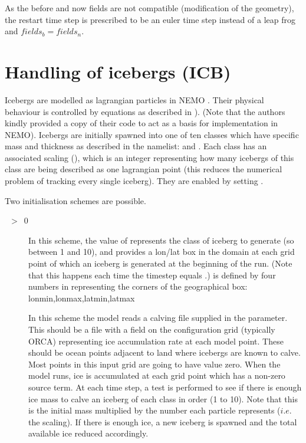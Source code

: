 \documentclass[../tex_main/NEMO_manual]{subfiles}
\begin{document}
As the before and now fields are not compatible (modification of the geometry), the restart time step is prescribed to be an euler time step instead of a leap frog and $fields_b = fields_n$.
%
\section{Handling of icebergs (ICB)}
\label{sec:ICB_icebergs}


Icebergs are modelled as lagrangian particles in NEMO \citep{Marsh_GMD2015}.
Their physical behaviour is controlled by equations as described in \citet{Martin_Adcroft_OM10} ).
(Note that the authors kindly provided a copy of their code to act as a basis for implementation in NEMO).
Icebergs are initially spawned into one of ten classes which have specific mass and thickness as described 
in the  namelist: 
 and .
Each class has an associated scaling (), which is an integer representing how many icebergs 
of this class are being described as one lagrangian point (this reduces the numerical problem of tracking every single iceberg).
They are enabled by setting .

Two initialisation schemes are possible.
\begin{description}
\item[~$>$~0]
In this scheme, the value of  represents the class of iceberg to generate 
(so between 1 and 10), and  provides a lon/lat box in the domain at each 
grid point of which an iceberg is generated at the beginning of the run. 
(Note that this happens each time the timestep equals .)
 is defined by four numbers in  representing the corners 
of the geographical box: lonmin,lonmax,latmin,latmax
\item[]
In this scheme the model reads a calving file supplied in the  parameter.
This should be a file with a field on the configuration grid (typically ORCA) representing ice accumulation rate at each model point. 
These should be ocean points adjacent to land where icebergs are known to calve.
Most points in this input grid are going to have value zero.
When the model runs, ice is accumulated at each grid point which has a non-zero source term.
At each time step, a test is performed to see if there is enough ice mass to calve an iceberg of each class in order (1 to 10).
Note that this is the initial mass multiplied by the number each particle represents ($i.e.$ the scaling).
If there is enough ice, a new iceberg is spawned and the total available ice reduced accordingly.
\end{description}
\end{document}
